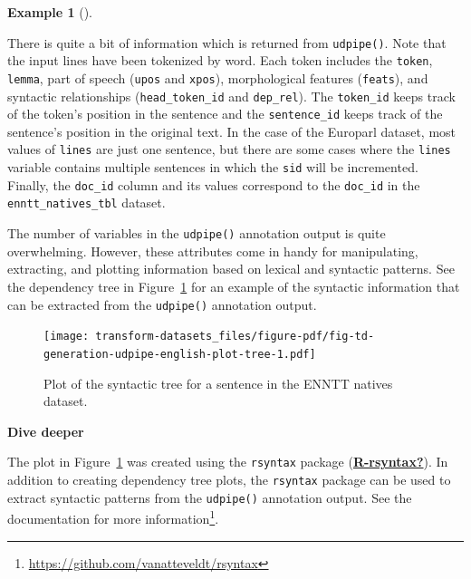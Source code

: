 \documentclass[
  letterpaper,
  DIV=11,
  numbers=noendperiod]{scrreport}
\theoremstyle{definition}
\newtheorem{example}{Example}[chapter]
\theoremstyle{remark}
\DeclareRobustCommand{\href}[2]{#2\footnote{\url{#1}}}
\begin{document}
\begin{example}[]
\end{example}

There is quite a bit of information which is returned from
\texttt{udpipe()}. Note that the input lines have been tokenized by
word. Each token includes the \texttt{token}, \texttt{lemma}, part of
speech (\texttt{upos} and \texttt{xpos}), morphological features
(\texttt{feats}), and syntactic relationships (\texttt{head\_token\_id}
and \texttt{dep\_rel}). The \texttt{token\_id} keeps track of the
token's position in the sentence and the \texttt{sentence\_id} keeps
track of the sentence's position in the original text. In the case of
the Europarl dataset, most values of \texttt{lines} are just one
sentence, but there are some cases where the \texttt{lines} variable
contains multiple sentences in which the \texttt{sid} will be
incremented. Finally, the \texttt{doc\_id} column and its values
correspond to the \texttt{doc\_id} in the \texttt{enntt\_natives\_tbl}
dataset.

The number of variables in the \texttt{udpipe()} annotation output is
quite overwhelming. However, these attributes come in handy for
manipulating, extracting, and plotting information based on lexical and
syntactic patterns. See the dependency tree in
Figure~\ref{fig-td-generation-udpipe-english-plot-tree} for an example
of the syntactic information that can be extracted from the
\texttt{udpipe()} annotation output.

\begin{figure}[H]

{\centering \texttt{[image: transform-datasets\_files/figure-pdf/fig-td-generation-udpipe-english-plot-tree-1.pdf]}

}

\caption{\label{fig-td-generation-udpipe-english-plot-tree}Plot of the
syntactic tree for a sentence in the ENNTT natives dataset.}

\end{figure}

\begin{tcolorbox}[enhanced jigsaw, leftrule=.75mm, bottomrule=.15mm, opacityback=0, breakable, left=2mm, colback=white, toprule=.15mm, arc=.35mm, rightrule=.15mm]

\textbf{ Dive deeper}

The plot in Figure~\ref{fig-td-generation-udpipe-english-plot-tree} was
created using the \texttt{rsyntax} package
(\protect\hyperlink{ref-R-rsyntax}{\textbf{R-rsyntax?}}). In addition to
creating dependency tree plots, the \texttt{rsyntax} package can be used
to extract syntactic patterns from the \texttt{udpipe()} annotation
output. \href{https://github.com/vanatteveldt/rsyntax}{See the
documentation for more information}.

\end{tcolorbox}
\end{document}
